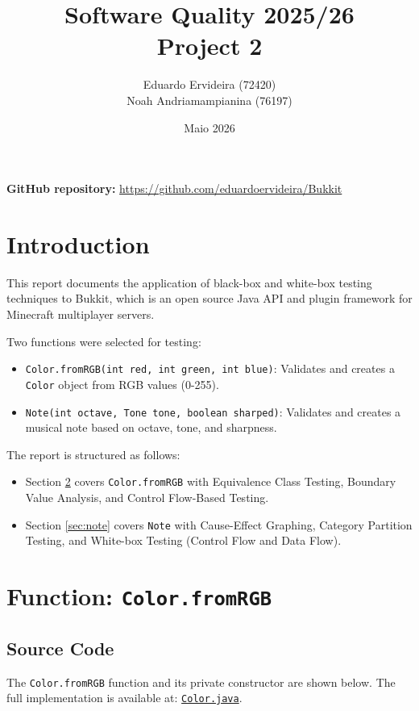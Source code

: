 \documentclass[11pt, a4paper]{article}
\title{
    \textbf{Software Quality 2025/26} \\[0.3cm]
    \large Project 2
}
\author{
    Eduardo Ervideira (72420) \\
    Noah Andriamampianina (76197)
}
\date{Maio 2026}
\begin{document}
\maketitle

\begin{center}
\textbf{GitHub repository:} \url{https://github.com/eduardoervideira/Bukkit} \\[0.2cm]
\end{center}


\section{Introduction}
This report documents the application of black-box and white-box testing techniques to Bukkit, which is an open source Java API and plugin framework for Minecraft multiplayer servers. 

Two functions were selected for testing:
\begin{itemize}
    \item \texttt{Color.fromRGB(int red, int green, int blue)}: Validates and creates a \texttt{Color} object from RGB values (0-255).
    \item \texttt{Note(int octave, Tone tone, boolean sharped)}: Validates and creates a musical note based on octave, tone, and sharpness.
\end{itemize}

The report is structured as follows:
\begin{itemize}
    \item Section \ref{sec:color} covers \texttt{Color.fromRGB} with Equivalence Class Testing, Boundary Value Analysis, and Control Flow-Based Testing.
    \item Section \ref{sec:note} covers \texttt{Note} with Cause-Effect Graphing, Category Partition Testing, and White-box Testing (Control Flow and Data Flow).
\end{itemize}

\section{Function: \texttt{Color.fromRGB}}
\label{sec:color}

\subsection{Source Code}
The \texttt{Color.fromRGB} function and its private constructor are shown below. The full implementation is available at: \href{https://github.com/eduardoervideira/Bukkit/blob/master/src/main/java/org/bukkit/Color.java}{\texttt{Color.java}}.
\end{document}
